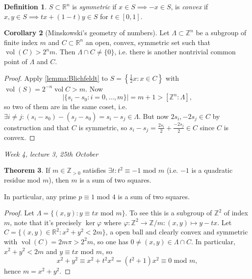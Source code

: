 \documentclass{article}
\newcommand{\Z}{\mathbb{Z}}
\newcommand{\R}{\mathbb{R}}
\newcommand{\Mod}{\text{ mod }}
\newcommand{\vol}{\operatorname{vol}}
\theoremstyle{definition}
\newtheorem{defn}{Definition}[subsection]
\newtheorem{thm}[defn]{Theorem}
\newtheorem{coro}[defn]{Corollary}
\begin{document}
\begin{defn}
$S\subset\R^n$ is \textit{symmetric} if $x\in S\implies -x\in S$, is \textit{convex} if $x,y\in S\implies tx+(1-t)y\in S$ for $t\in [0,1]$.
\end{defn}

\begin{coro}[Minskowski's geometry of numbers]
\label{coro:Minkowski}
Let $\Lambda\subset\Z^n$ be a subgroup of finite index $m$ and $C\subset\R^n$ an open, convex, symmetric set such that $\vol(C)>2^nm$. Then $\Lambda\cap C\neq\{0\}$, i.e. there is another nontrivial common point of $\Lambda$ and $C$.
\end{coro}
\begin{proof}
Apply \ref{lemma:Blichfeldt} to $S=\left\{\frac12 x:x\in C\right\}$ with $\vol(S)=2^{-n}\vol C>m$. Now
\[
|\{s_i-s_0:i=0,\ldots,m\}|=m+1>[\Z^n:\Lambda],
\]
so two of them are in the same coset, i.e. $\exists i\neq j:(s_i-s_0)-(s_j-s_0)=s_i-s_j\in\Lambda$. But now $2s_i,-2s_j\in C$ by construction and that $C$ is symmetric, so $s_i-s_j=\frac{2s_i}{2}+\frac{-2s_j}{2}\in C$ since $C$ is convex.
\end{proof}

\begin{flushright}
\textit{Week 4, lecture 3, 25th October}
\end{flushright}

\begin{thm}
If $m\in\Z_{>0}$ satisfies $\exists t:t^2\equiv -1\Mod m$ (i.e. $-1$ is a quadratic residue mod $m$), then $m$ is a sum of two squares.

In particular, any prime $p\equiv 1\Mod 4$ is a sum of two squares.
\end{thm}
\begin{proof}
Let $\Lambda=\{(x,y):y\equiv tx\Mod m\}$. To see this is a subgroup of $\Z^2$ of index $m$, note that it's precisely $\ker\varphi$ where $\varphi:\Z^2\rightarrow\Z/m:(x,y)\mapsto y-tx$. Let $C=\{(x,y)\in\R^2:x^2+y^2<2m\}$, a open ball and clearly convex and symmetric with $\vol(C)=2m\pi>2^2m$, so one has $0\neq (x,y)\in\Lambda \cap C$. In particular, $x^2+y^2<2m$ and $y\equiv tx\Mod m$, so
\[
x^2+y^2\equiv x^2+t^2x^2=(t^2+1)x^2\equiv 0\Mod m,
\]
hence $m=x^2+y^2$.
\end{proof}
\end{document}
